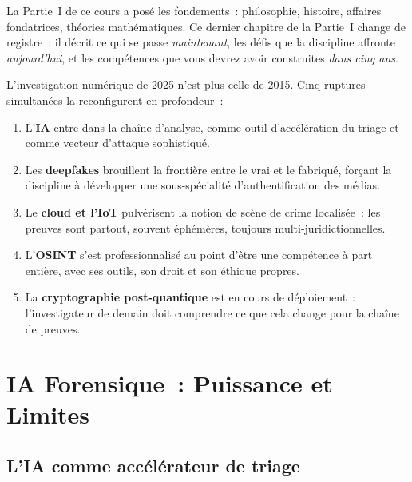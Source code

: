 La Partie~I de ce cours a posé les fondements~: philosophie, histoire,
affaires fondatrices, théories mathématiques. Ce dernier chapitre de la
Partie~I change de registre~: il décrit ce qui se passe \emph{maintenant},
les défis que la discipline affronte \emph{aujourd'hui}, et les compétences
que vous devrez avoir construites \emph{dans cinq ans}.

\medskip

L'investigation numérique de 2025 n'est plus celle de 2015. Cinq ruptures
simultanées la reconfigurent en profondeur~:
\begin{enumerate}
    \item L'\textbf{IA} entre dans la chaîne d'analyse, comme outil
          d'accélération du triage et comme vecteur d'attaque sophistiqué.
    \item Les \textbf{deepfakes} brouillent la frontière entre le vrai
          et le fabriqué, forçant la discipline à développer une
          sous-spécialité d'authentification des médias.
    \item Le \textbf{cloud et l'IoT} pulvérisent la notion de scène de
          crime localisée~: les preuves sont partout, souvent éphémères,
          toujours multi-juridictionnelles.
    \item L'\textbf{OSINT} s'est professionnalisé au point d'être une
          compétence à part entière, avec ses outils, son droit et son
          éthique propres.
    \item La \textbf{cryptographie post-quantique} est en cours de
          déploiement~: l'investigateur de demain doit comprendre ce que
          cela change pour la chaîne de preuves.
\end{enumerate}

\separateur

\section{IA Forensique~: Puissance et Limites}
\label{sec:ia-forensique}

\subsection{L'IA comme accélérateur de triage}


